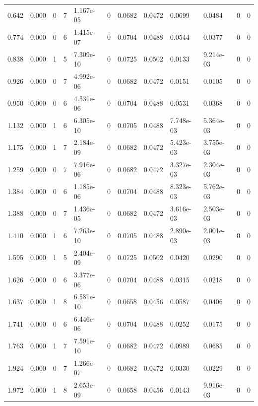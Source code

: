 \documentclass[preview]{standalone}
\begin{document}
{{\begin{tabular}{L{1.2cm}C{1.2cm} C{0.3cm}C{0.5cm} C{1.4cm}C{1.4cm} C{1.4cm}C{1.4cm} C{1.6cm}C{1.6cm} C{1.6cm}C{1.6cm}}
  0.642  &  0.000  & 0     &  7 &  1.167e-05  & 0  &  0.0682&   0.0472& 0.0699 & 0.0484   &  0 & 0  \\ 
  0.774  &  0.000  & 0     &  6 &  1.415e-07  & 0  &  0.0704&   0.0488& 0.0544 & 0.0377   &  0 & 0  \\ 
  0.838  &  0.000  & 1     &  5 &  7.309e-10  & 0  &  0.0725&   0.0502& 0.0133 & 9.214e-03   &  0 & 0  \\ 
  0.926  &  0.000  & 0     &  7 &  4.992e-06  & 0  &  0.0682&   0.0472& 0.0151 & 0.0105   &  0 & 0  \\ 
  0.950  &  0.000  & 0     &  6 &  4.531e-06  & 0  &  0.0704&   0.0488& 0.0531 & 0.0368   &  0 & 0  \\ 
  1.132  &  0.000  & 1     &  6 &  6.305e-10  & 0  &  0.0705&   0.0488& 7.748e-03 & 5.364e-03   &  0 & 0  \\ 
  1.175  &  0.000  & 1     &  7 &  2.184e-09  & 0  &  0.0682&   0.0472& 5.423e-03 & 3.755e-03   &  0 & 0  \\ 
  1.259  &  0.000  & 0     &  7 &  7.916e-06  & 0  &  0.0682&   0.0472& 3.327e-03 & 2.304e-03   &  0 & 0  \\ 
  1.384  &  0.000  & 0     &  6 &  1.185e-06  & 0  &  0.0704&   0.0488& 8.323e-03 & 5.762e-03   &  0 & 0  \\ 
  1.388  &  0.000  & 0     &  7 &  1.436e-05  & 0  &  0.0682&   0.0472& 3.616e-03 & 2.503e-03   &  0 & 0  \\ 
  1.410  &  0.000  & 1     &  6 &  7.263e-10  & 0  &  0.0705&   0.0488& 2.890e-03 & 2.001e-03   &  0 & 0  \\ 
  1.595  &  0.000  & 1     &  5 &  2.404e-09  & 0  &  0.0725&   0.0502& 0.0420 & 0.0290   &  0 & 0  \\ 
  1.626  &  0.000  & 0     &  6 &  3.377e-06  & 0  &  0.0704&   0.0488& 0.0315 & 0.0218   &  0 & 0  \\ 
  1.637  &  0.000  & 1     &  8 &  6.581e-10  & 0  &  0.0658&   0.0456& 0.0587 & 0.0406   &  0 & 0  \\ 
  1.741  &  0.000  & 0     &  6 &  6.446e-06  & 0  &  0.0704&   0.0488& 0.0252 & 0.0175   &  0 & 0  \\ 
  1.763  &  0.000  & 1     &  7 &  7.591e-10  & 0  &  0.0682&   0.0472& 0.0989 & 0.0685   &  0 & 0  \\ 
  1.924  &  0.000  & 0     &  7 &  1.266e-07  & 0  &  0.0682&   0.0472& 0.0330 & 0.0229   &  0 & 0  \\ 
  1.972  &  0.000  & 1     &  8 &  2.653e-09  & 0  &  0.0658&   0.0456& 0.0143 & 9.916e-03   &  0 & 0  \\ 

\end{tabular}}}
\end{document}
